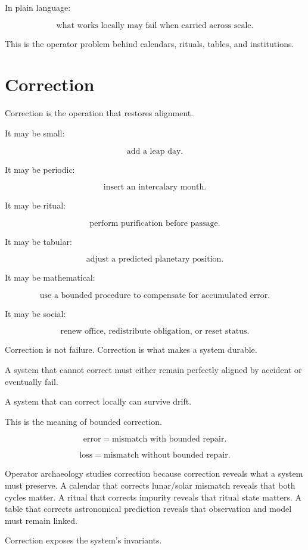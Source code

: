 \documentclass[11pt]{book}
\begin{document}
In plain language:

\[
\text{what works locally may fail when carried across scale}.
\]

This is the operator problem behind calendars, rituals, tables, and institutions.

\section{Correction}

Correction is the operation that restores alignment.

It may be small:

\[
\text{add a leap day}.
\]

It may be periodic:

\[
\text{insert an intercalary month}.
\]

It may be ritual:

\[
\text{perform purification before passage}.
\]

It may be tabular:

\[
\text{adjust a predicted planetary position}.
\]

It may be mathematical:

\[
\text{use a bounded procedure to compensate for accumulated error}.
\]

It may be social:

\[
\text{renew office, redistribute obligation, or reset status}.
\]

Correction is not failure. Correction is what makes a system durable.

A system that cannot correct must either remain perfectly aligned by accident or eventually fail.

A system that can correct locally can survive drift.

This is the meaning of bounded correction.

\[
\text{error} = \text{mismatch with bounded repair}.
\]

\[
\text{loss} = \text{mismatch without bounded repair}.
\]

Operator archaeology studies correction because correction reveals what a system must preserve. A calendar that corrects lunar/solar mismatch reveals that both cycles matter. A ritual that corrects impurity reveals that ritual state matters. A table that corrects astronomical prediction reveals that observation and model must remain linked.

Correction exposes the system's invariants.
\end{document}
